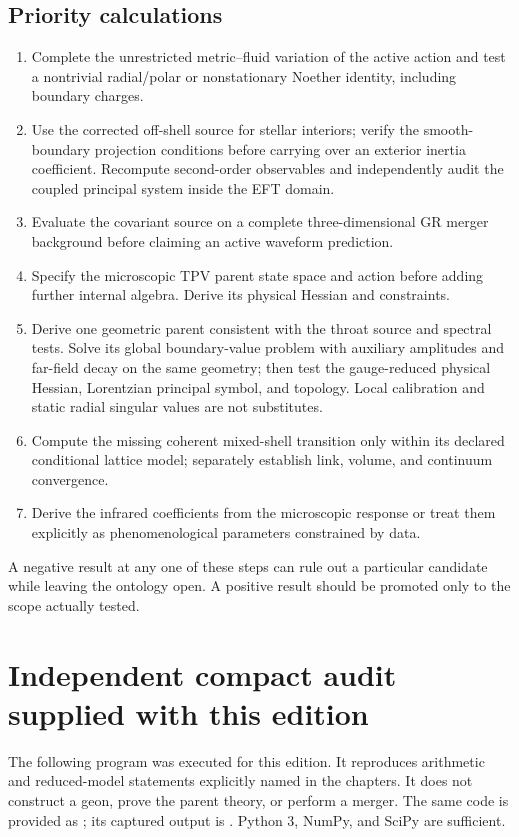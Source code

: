 \documentclass[11pt,oneside]{report}
\begin{document}
\section{Priority calculations}
\begin{enumerate}
\item Complete the unrestricted metric--fluid variation of the active action and test a nontrivial radial/polar or nonstationary Noether identity, including boundary charges.
\item Use the corrected off-shell source for stellar interiors; verify the smooth-boundary projection conditions before carrying over an exterior inertia coefficient. Recompute second-order observables and independently audit the coupled principal system inside the EFT domain.
\item Evaluate the covariant source on a complete three-dimensional GR merger background before claiming an active waveform prediction.
\item Specify the microscopic TPV parent state space and action before adding further internal algebra. Derive its physical Hessian and constraints.
\item Derive one geometric parent consistent with the throat source and spectral tests. Solve its global boundary-value problem with auxiliary amplitudes and far-field decay on the same geometry; then test the gauge-reduced physical Hessian, Lorentzian principal symbol, and topology. Local calibration and static radial singular values are not substitutes.
\item Compute the missing coherent mixed-shell transition only within its declared conditional lattice model; separately establish link, volume, and continuum convergence.
\item Derive the infrared coefficients from the microscopic response or treat them explicitly as phenomenological parameters constrained by data.
\end{enumerate}
A negative result at any one of these steps can rule out a particular candidate while leaving the ontology open. A positive result should be promoted only to the scope actually tested.

\appendix
\chapter{Independent compact audit supplied with this edition}
The following program was executed for this edition. It reproduces arithmetic and reduced-model statements explicitly named in the chapters. It does not construct a geon, prove the parent theory, or perform a merger. The same code is provided as ; its captured output is . Python 3, NumPy, and SciPy are sufficient.
\end{document}
